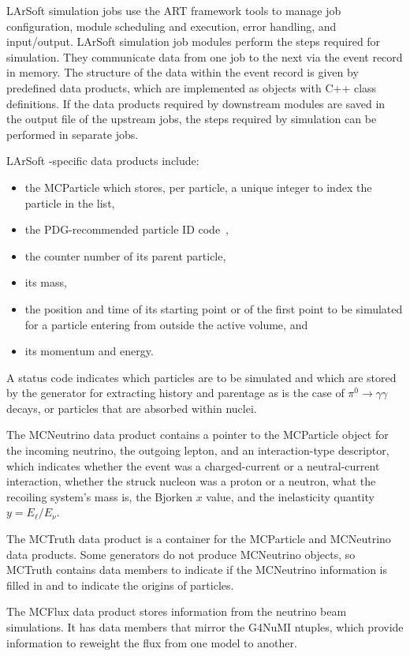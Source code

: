 \documentclass[12pt]{elsarticle}
\newcommand{\larsoft}{LArSoft }
\begin{document}
\larsoft simulation jobs use the ART framework tools to manage job configuration, module scheduling and execution, error handling, and input/output. \larsoft simulation job modules perform the steps required for simulation. They communicate data from one job to the next via the event record in memory. The structure of the data within the event record is given by predefined data products, which are implemented as objects with C++ class definitions. If the data products required by downstream modules are saved in the output file of the upstream jobs, the steps required by simulation can be performed in separate jobs.

\larsoft-specific data products include:
\begin{itemize}

\item{the MCParticle which stores, per particle, a unique integer to index the particle in the list,}
\item{the PDG-recommended particle ID code~\cite{pdgcode}, }
\item{the counter number of its parent particle,}
\item{its mass,}
\item{the position and time of its starting point or of the first point to be simulated
for a particle entering from outside the active volume, and}
\item{its momentum and energy.}
\end{itemize}
A status code indicates which particles are to be simulated and which
are stored by the generator for extracting history and parentage as is the
case of $\pi^0\rightarrow\gamma\gamma$ decays, or particles that are absorbed within
nuclei.

The MCNeutrino data product contains a pointer to the MCParticle object for
the incoming neutrino, the outgoing lepton, and an interaction-type descriptor,
which indicates whether the event was a charged-current or a neutral-current interaction,
whether the struck nucleon was a proton or a neutron, what the recoiling system's mass is,
the Bjorken $x$ value, and the inelasticity quantity $y=E_\ell/E_\nu$.

The MCTruth data product is a container for the MCParticle and MCNeutrino
data products.  Some generators do not produce MCNeutrino objects, so MCTruth contains data members to indicate if the MCNeutrino information is filled in and to indicate the origins of particles.
 
The MCFlux data product stores information from the neutrino beam simulations. It has data members that mirror the G4NuMI ntuples, which provide information to reweight the flux from one model to another.
\end{document}
